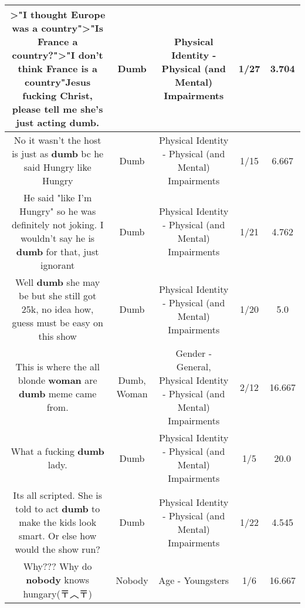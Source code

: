 \documentclass[11pt]{article}
\newlength\mylength
\begin{document}
\begin{center}
\begin{longtable}{|C{.65\mylength}|C{.30\mylength}|C{.12\mylength}|C{.12\mylength}|C{.12\mylength}|}
  \small >"I thought Europe was a country">"Is France a country?">"I don't think France is a country"Jesus fucking Christ, please tell me she's just acting \textbf{dumb}.\normalsize   & Dumb & Physical Identity - Physical (and Mental) Impairments & 1/27 & 3.704 \\  \hline
  \small No it wasn't the host is just as \textbf{dumb} bc he said Hungry like Hungry\normalsize   & Dumb & Physical Identity - Physical (and Mental) Impairments & 1/15 & 6.667 \\  \hline
  \small He said "like I'm Hungry" so he was definitely not joking. I wouldn't say he is \textbf{dumb} for that, just ignorant\normalsize   & Dumb & Physical Identity - Physical (and Mental) Impairments & 1/21 & 4.762 \\  \hline
  \small Well \textbf{dumb} she may be but she still got 25k, no idea how, guess must be easy on this show\normalsize   & Dumb & Physical Identity - Physical (and Mental) Impairments & 1/20 & 5.0 \\  \hline
  \small This is where the all blonde \textbf{woman} are \textbf{dumb} meme came from.\normalsize   & Dumb, Woman & Gender - General, Physical Identity - Physical (and Mental) Impairments & 2/12 & 16.667 \\  \hline
  \small What a fucking \textbf{dumb} lady.\normalsize   & Dumb & Physical Identity - Physical (and Mental) Impairments & 1/5 & 20.0 \\  \hline
  \small Its all scripted. She is told to act \textbf{dumb} to make the kids look smart. Or else how would the show run?\normalsize   & Dumb & Physical Identity - Physical (and Mental) Impairments & 1/22 & 4.545 \\  \hline
  \small Why??? Why do \textbf{nobody} knows hungary(〒︿〒)\normalsize   & Nobody & Age - Youngsters & 1/6 & 16.667 \\  \hline

\end{longtable}
\end{center}
\end{document}
